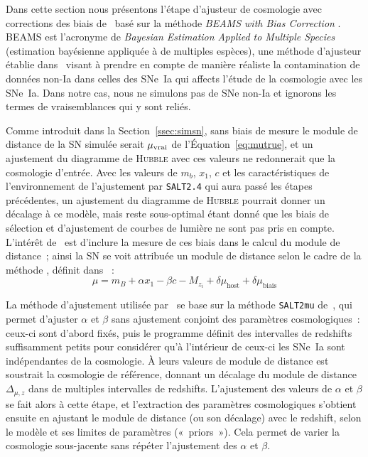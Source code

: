 \documentclass[../main/main.tex]{subfiles}
\begin{document}
Dans cette section nous présentons l'étape d'ajusteur de cosmologie avec
corrections des biais de \snana\ basé sur la méthode \textit{BEAMS with Bias
Correction} \citep[\bbc,][]{kessler2017}. BEAMS est l'acronyme de
\textit{Bayesian Estimation Applied to Multiple Species} (estimation bayésienne
appliquée à de multiples espèces), une méthode d'ajusteur établie
dans~\cite{kunz2007} visant à prendre en compte de manière réaliste la
contamination de données non-Ia dans celles des SNe~Ia qui affects l'étude de la
cosmologie avec les SNe~Ia. Dans notre cas, nous ne simulons pas de SNe non-Ia
et ignorons les termes de vraisemblances qui y sont reliés.

Comme introduit dans la Section~\ref{ssec:simsn}, sans biais de mesure le module
de distance de la SN simulée serait $\mu_{\rm vrai}$ de
l'Équation~\ref{eq:mutrue}, et un ajustement du diagramme de \textsc{Hubble}
avec ces valeurs ne redonnerait que la cosmologie d'entrée. Avec les valeurs de
$m_b$, $x_1$, $c$ et les caractéristiques de l'environnement de l'ajustement par
\texttt{SALT2.4} qui aura passé les étapes précédentes, un ajustement du
diagramme de \textsc{Hubble} pourrait donner un décalage à ce modèle, mais reste
sous-optimal étant donné que les biais de sélection et d'ajustement de courbes
de lumière ne sont pas pris en compte. L'intérêt de \bbc\ est d'inclure la
mesure de ces biais dans le calcul du module de distance~; ainsi la SN se voit
attribuée un module de distance selon le cadre de la méthode \bbc, définit dans
\citep{popovic2021a}~:
\begin{equation}\label{eq:mu}
    \mu = m_B + \alpha x_1 - \beta c - M_{z_i} + \delta\mu_\mathrm{host} +
    \delta\mu _\mathrm{biais}
\end{equation}

La méthode d'ajustement utilisée par \bbc\ se base sur
la méthode \texttt{SALT2mu} de~\cite{marriner2011}, qui permet d'ajuster
$\alpha$ et $\beta$ sans ajustement conjoint des paramètres cosmologiques~:
ceux-ci sont d'abord fixés, puis le programme définit des intervalles de
redshifts suffisamment petits pour considérer qu'à l'intérieur de ceux-ci les
SNe~Ia sont indépendantes de la cosmologie. À leurs valeurs de module de
distance est soustrait la cosmologie de référence, donnant un décalage du module
de distance $\Delta_{\mu,z}$ dans de multiples intervalles de redshifts.
L'ajustement des valeurs de $\alpha$ et $\beta$ se fait alors à cette étape, et
l'extraction des paramètres cosmologiques s'obtient ensuite en ajustant le
module de distance (ou son décalage) avec le redshift, selon le modèle et ses
limites de paramètres («~priors~»). Cela permet de varier la cosmologie
sous-jacente sans répéter l'ajustement des $\alpha$ et $\beta$.
\end{document}
